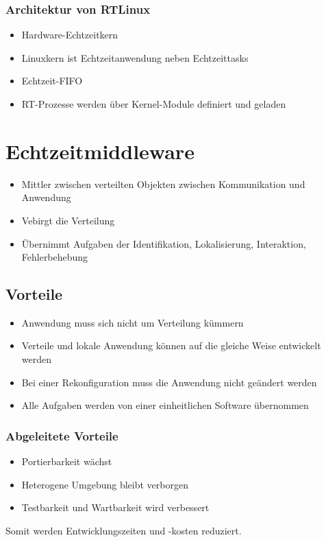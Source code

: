 \subsubsection{Architektur von RTLinux}
\begin{itemize}
	\item Hardware-Echtzeitkern
	\item Linuxkern ist Echtzeitanwendung neben Echtzeittasks
	\item Echtzeit-FIFO
	\item RT-Prozesse werden über Kernel-Module definiert und geladen
\end{itemize}



\section{Echtzeitmiddleware}
\begin{itemize}
	\item Mittler zwischen verteilten Objekten zwischen Kommunikation und Anwendung
	\item Vebirgt die Verteilung
	\item Übernimmt Aufgaben der Identifikation, Lokalisierung, Interaktion, Fehlerbehebung
\end{itemize}

\subsection{Vorteile}
\begin{itemize}
	\item Anwendung muss sich nicht um Verteilung kümmern
	\item Verteile und lokale Anwendung können auf die gleiche Weise entwickelt werden
	\item Bei einer Rekonfiguration muss die Anwendung nicht geändert werden
	\item Alle Aufgaben werden von einer einheitlichen Software übernommen
\end{itemize}

\subsubsection{Abgeleitete Vorteile}
\begin{itemize}
	\item Portierbarkeit wächst
	\item Heterogene Umgebung bleibt verborgen
	\item Testbarkeit und Wartbarkeit wird verbessert
\end{itemize}
Somit werden Entwicklungszeiten und -kosten reduziert.

